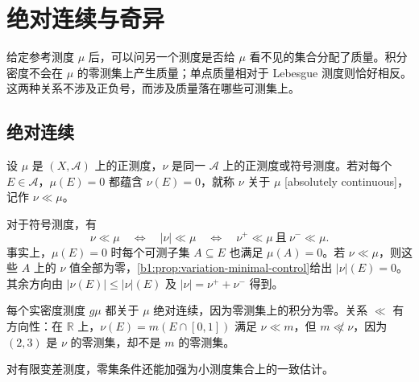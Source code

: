\section{绝对连续与奇异}
\label{b1:sec:0603}


给定参考测度 \(\mu\) 后，可以问另一个测度是否给 \(\mu\) 看不见的集合分配了质量。积分密度不会在 \(\mu\) 的零测集上产生质量；单点质量相对于 Lebesgue 测度则恰好相反。这两种关系不涉及正负号，而涉及质量落在哪些可测集上。

\subsection{绝对连续}
\label{b1:subsec:060301}

\begin{definition}\label{b1:def:measure-absolute-continuity}
设 \(\mu\) 是 \((X,\mathcal A)\) 上的正测度，\(\nu\) 是同一 \(\mathcal A\) 上的正测度或符号测度。若对每个 \(E\in\mathcal A\)，\(\mu(E)=0\) 都蕴含 \(\nu(E)=0\)，就称 \(\nu\) 关于 \(\mu\) [absolutely continuous]，记作 \(\nu\ll\mu\)。
\end{definition}

对于符号测度，有
\[
\nu\ll\mu\quad\Longleftrightarrow\quad|\nu|\ll\mu
\quad\Longleftrightarrow\quad\nu^+\ll\mu\ \text{且}\ \nu^-\ll\mu.
\]
事实上，\(\mu(E)=0\) 时每个可测子集 \(A\subseteq E\) 也满足 \(\mu(A)=0\)。若 \(\nu\ll\mu\)，则这些 \(A\) 上的 \(\nu\) 值全部为零，\cref{b1:prop:variation-minimal-control}给出 \(|\nu|(E)=0\)。其余方向由 \(|\nu(E)|\leq|\nu|(E)\) 及 \(|\nu|=\nu^++\nu^-\) 得到。

\ProseParagraphBreak

每个实密度测度 \(g\mu\) 都关于 \(\mu\) 绝对连续，因为零测集上的积分为零。关系 \(\ll\) 有方向性：在 \(\mathbb R\) 上，\(\nu(E)=m(E\cap[0,1])\) 满足 \(\nu\ll m\)，但 \(m\not\ll\nu\)，因为 \((2,3)\) 是 \(\nu\) 的零测集，却不是 \(m\) 的零测集。

\ProseParagraphBreak

对有限变差测度，零集条件还能加强为小测度集合上的一致估计。

